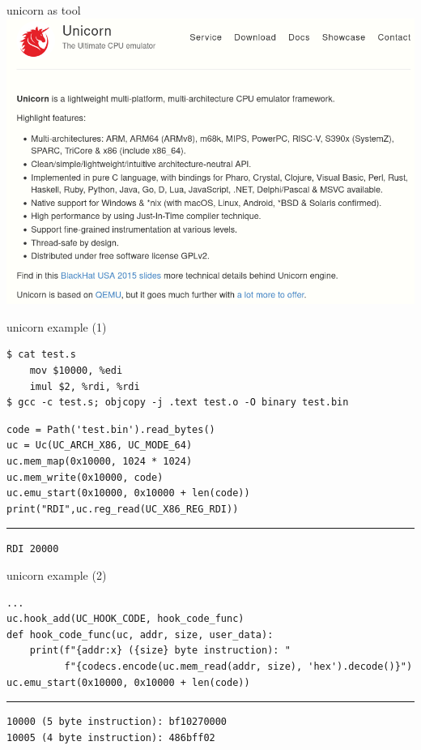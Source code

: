 
\begin{frame}{unicorn as tool}
\includegraphics[width=\textwidth]{../antianti/unicorn-page}
\end{frame}

\begin{frame}[fragile]{unicorn example (1)}
\begin{Verbatim}[fontsize=\small]
$ cat test.s
    mov $10000, %edi
    imul $2, %rdi, %rdi
$ gcc -c test.s; objcopy -j .text test.o -O binary test.bin
\end{Verbatim}
\begin{Verbatim}[fontsize=\small]
code = Path('test.bin').read_bytes()
uc = Uc(UC_ARCH_X86, UC_MODE_64)
uc.mem_map(0x10000, 1024 * 1024)
uc.mem_write(0x10000, code)
uc.emu_start(0x10000, 0x10000 + len(code))
print("RDI",uc.reg_read(UC_X86_REG_RDI))
\end{Verbatim}
\hrule
\texttt{RDI 20000}
\end{frame}

\begin{frame}[fragile]{unicorn example (2)}
\begin{Verbatim}[fontsize=\small]
...
uc.hook_add(UC_HOOK_CODE, hook_code_func)
def hook_code_func(uc, addr, size, user_data):
    print(f"{addr:x} ({size} byte instruction): "
          f"{codecs.encode(uc.mem_read(addr, size), 'hex').decode()}")
uc.emu_start(0x10000, 0x10000 + len(code))
\end{Verbatim}
\hrule
\begin{Verbatim}[fontsize=\small]
10000 (5 byte instruction): bf10270000
10005 (4 byte instruction): 486bff02
\end{Verbatim}
\end{frame}



